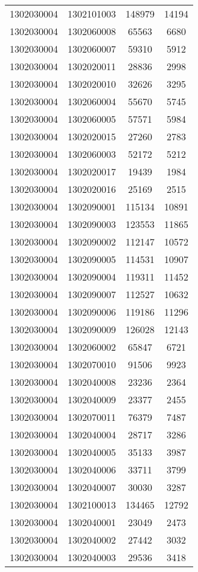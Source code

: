 \begin{longtable}[h]{llcc}
		1302030004 & 1302101003 & 148979 & 14194\\
		1302030004 & 1302060008 & 65563 & 6680\\
		1302030004 & 1302060007 & 59310 & 5912\\
		1302030004 & 1302020011 & 28836 & 2998\\
		1302030004 & 1302020010 & 32626 & 3295\\
		1302030004 & 1302060004 & 55670 & 5745\\
		1302030004 & 1302060005 & 57571 & 5984\\
		1302030004 & 1302020015 & 27260 & 2783\\
		1302030004 & 1302060003 & 52172 & 5212\\
		1302030004 & 1302020017 & 19439 & 1984\\
		1302030004 & 1302020016 & 25169 & 2515\\
		1302030004 & 1302090001 & 115134 & 10891\\
		1302030004 & 1302090003 & 123553 & 11865\\
		1302030004 & 1302090002 & 112147 & 10572\\
		1302030004 & 1302090005 & 114531 & 10907\\
		1302030004 & 1302090004 & 119311 & 11452\\
		1302030004 & 1302090007 & 112527 & 10632\\
		1302030004 & 1302090006 & 119186 & 11296\\
		1302030004 & 1302090009 & 126028 & 12143\\
		1302030004 & 1302060002 & 65847 & 6721\\
		1302030004 & 1302070010 & 91506 & 9923\\
		1302030004 & 1302040008 & 23236 & 2364\\
		1302030004 & 1302040009 & 23377 & 2455\\
		1302030004 & 1302070011 & 76379 & 7487\\
		1302030004 & 1302040004 & 28717 & 3286\\
		1302030004 & 1302040005 & 35133 & 3987\\
		1302030004 & 1302040006 & 33711 & 3799\\
		1302030004 & 1302040007 & 30030 & 3287\\
		1302030004 & 1302100013 & 134465 & 12792\\
		1302030004 & 1302040001 & 23049 & 2473\\
		1302030004 & 1302040002 & 27442 & 3032\\
		1302030004 & 1302040003 & 29536 & 3418\\

\end{longtable}
